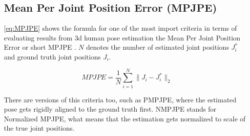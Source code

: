 \subsection{Mean Per Joint Position Error (MPJPE)}
\label{criteria:mpjpe}
\autoref{eq:MPJPE} shows the formula for one of the most import criteria in terms of evaluating results from 3d human pose estimation the Mean Per Joint Position Error or short MPJPE \cite{Zheng2020}. $N$ denotes the number of estimated joint positions $J_{i}^*$ and ground truth joint positions $J_{i}$. 

\begin{equation}
\label{eq:MPJPE}
MPJPE = \frac{1}{N} \sum_{i=1}^{N} \lVert J_{i} - J_{i}^*\rVert_{2}
\end{equation}

There are versions of this criteria too, such as PMPJPE, where the estimated pose gets rigidly aligned to the ground truth first. NMPJPE stands for Normalized MPJPE, what means that the estimation gets normalized to scale of the true joint positions. 